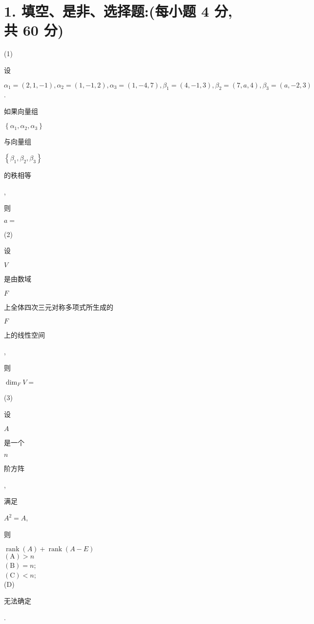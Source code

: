 \documentclass[10pt]{article}
\begin{document}
\section{1. 填空、是非、选择题:(每小题 4 分, 共 60 分)}
(1) \begin{CJK}{UTF8}{mj}设\end{CJK} $\alpha_{1}=(2,1,-1), \alpha_{2}=(1,-1,2), \alpha_{3}=(1,-4,7), \beta_{1}=(4,-1,3), \beta_{2}=(7, a, 4), \beta_{3}=(a,-2,3)$. \begin{CJK}{UTF8}{mj}如果向量组\end{CJK} $\left\{\alpha_{1}, \alpha_{2}, \alpha_{3}\right\}$ \begin{CJK}{UTF8}{mj}与向量组\end{CJK} $\left\{\beta_{1}, \beta_{2}, \beta_{3}\right\}$ \begin{CJK}{UTF8}{mj}的秩相等\end{CJK}, \begin{CJK}{UTF8}{mj}则\end{CJK} $a=$

(2) \begin{CJK}{UTF8}{mj}设\end{CJK} $V$ \begin{CJK}{UTF8}{mj}是由数域\end{CJK} $F$ \begin{CJK}{UTF8}{mj}上全体四次三元对称多项式所生成的\end{CJK} $F$ \begin{CJK}{UTF8}{mj}上的线性空间\end{CJK}, \begin{CJK}{UTF8}{mj}则\end{CJK} $\operatorname{dim}_{F} V=$

(3) \begin{CJK}{UTF8}{mj}设\end{CJK} $A$ \begin{CJK}{UTF8}{mj}是一个\end{CJK} $n$ \begin{CJK}{UTF8}{mj}阶方阵\end{CJK}, \begin{CJK}{UTF8}{mj}满足\end{CJK} $A^{2}=A$, \begin{CJK}{UTF8}{mj}则\end{CJK} $\operatorname{rank}(A)+\operatorname{rank}(A-E)$\\
$(\mathrm{A})>n$\\
$(\mathrm{B})=n$;\\
$(\mathrm{C})<n$;\\
(D) \begin{CJK}{UTF8}{mj}无法确定\end{CJK}.
\end{document}
